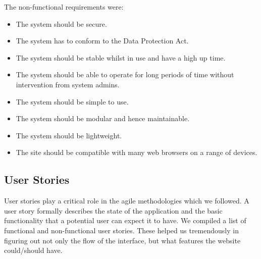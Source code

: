\documentclass{l3proj}
\begin{document}
The non-functional requirements were:
\begin{itemize}
\item The system should be secure.
\item The system has to conform to the Data Protection Act.
\item The system should be stable whilst in use and have a high up time.
\item The system should be able to operate for long periods of time without intervention from system admins.
\item The system should be simple to use.
\item The system should be modular and hence maintainable.
\item The system should be lightweight.
\item The site should be compatible with many web browsers on a range of devices.

\end{itemize}

\subsection{User Stories}
\label{user_stories}

User stories \cite{UserStories} play a critical role in the agile methodologies which we followed. A user story formally describes the state of the application and the basic functionality that a potential user can expect it to have. We compiled a list of functional and non-functional user stories. These helped us tremendously in figuring out not only the flow of the interface, but what features the website could/should have.
\end{document}
